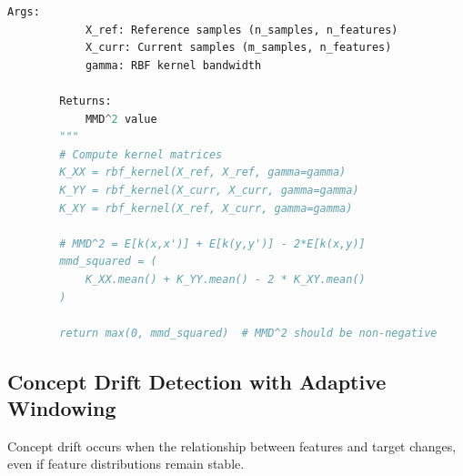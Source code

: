\begin{lstlisting}[language=Python, caption={Advanced Multi-Dimensional Drift Detector}]
        Args:
            X_ref: Reference samples (n_samples, n_features)
            X_curr: Current samples (m_samples, n_features)
            gamma: RBF kernel bandwidth

        Returns:
            MMD^2 value
        """
        # Compute kernel matrices
        K_XX = rbf_kernel(X_ref, X_ref, gamma=gamma)
        K_YY = rbf_kernel(X_curr, X_curr, gamma=gamma)
        K_XY = rbf_kernel(X_ref, X_curr, gamma=gamma)

        # MMD^2 = E[k(x,x')] + E[k(y,y')] - 2*E[k(x,y)]
        mmd_squared = (
            K_XX.mean() + K_YY.mean() - 2 * K_XY.mean()
        )

        return max(0, mmd_squared)  # MMD^2 should be non-negative
\end{lstlisting}

\subsection{Concept Drift Detection with Adaptive Windowing}

Concept drift occurs when the relationship between features and target changes, even if feature distributions remain stable.

